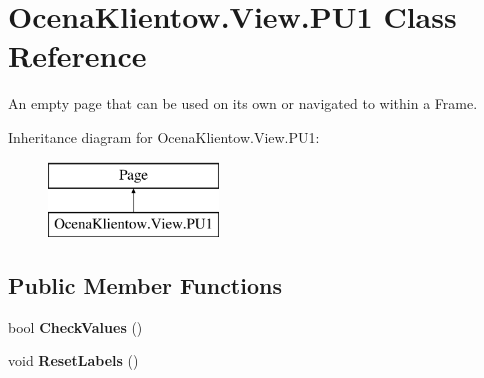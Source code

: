\hypertarget{class_ocena_klientow_1_1_view_1_1_p_u1}{}\section{Ocena\+Klientow.\+View.\+P\+U1 Class Reference}
\label{class_ocena_klientow_1_1_view_1_1_p_u1}


An empty page that can be used on its own or navigated to within a Frame.  


Inheritance diagram for Ocena\+Klientow.\+View.\+P\+U1\+:\begin{figure}[H]
\begin{center}
\leavevmode
\includegraphics[height=2.000000cm]{class_ocena_klientow_1_1_view_1_1_p_u1}
\end{center}
\end{figure}
\subsection*{Public Member Functions}
\begin{DoxyCompactItemize}
\item 
\hypertarget{class_ocena_klientow_1_1_view_1_1_p_u1_a1443df9fd89fc7a7cf5ebf16dcd6c325}{}\label{class_ocena_klientow_1_1_view_1_1_p_u1_a1443df9fd89fc7a7cf5ebf16dcd6c325} 
bool {\bfseries Check\+Values} ()
\item 
\hypertarget{class_ocena_klientow_1_1_view_1_1_p_u1_a1177f893a7be101990c8b9b1d81a42ad}{}\label{class_ocena_klientow_1_1_view_1_1_p_u1_a1177f893a7be101990c8b9b1d81a42ad} 
void {\bfseries Reset\+Labels} ()
\end{DoxyCompactItemize}
